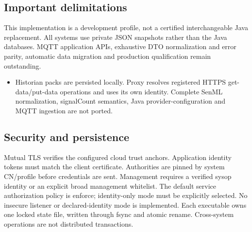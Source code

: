 \documentclass[a4paper]{arrowhead}
\begin{document}
\subsection{Important delimitations}
This implementation is a development profile, not a certified interchangeable Java replacement. All systems use private JSON snapshots rather than the Java databases. MQTT application APIs, exhaustive DTO normalization and error parity, automatic data migration and production qualification remain outstanding.
\begin{itemize}
\item Historian packs are persisted locally. Proxy resolves registered HTTPS get-data/put-data operations and uses its own identity. Complete SenML normalization, signalCount semantics, Java provider-configuration and MQTT ingestion are not ported.
\end{itemize}
\subsection{Security and persistence}
Mutual TLS verifies the configured cloud trust anchors. Application identity tokens must match the client certificate. Authorities are pinned by system CN/profile before credentials are sent. Management requires a verified sysop identity or an explicit broad management whitelist. The default service authorization policy is enforce; identity-only mode must be explicitly selected. No insecure listener or declared-identity mode is implemented. Each executable owns one locked state file, written through fsync and atomic rename. Cross-system operations are not distributed transactions.
\clearpage
\end{document}
